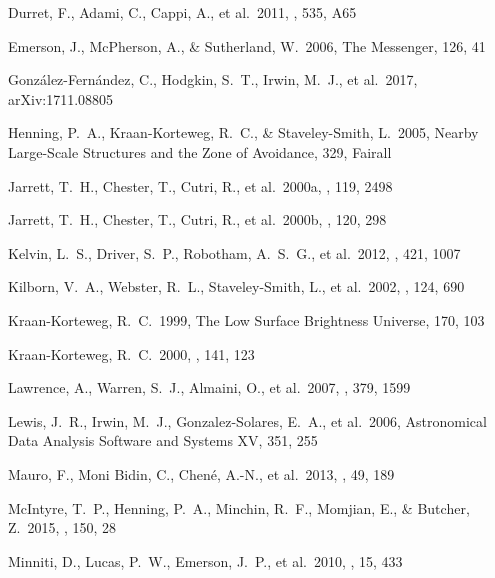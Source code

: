 \documentclass[preprint2]{aastex}
\begin{document}
\begin{thebibliography}{}
    Durret, F., Adami, C., Cappi, A., et al.\ 2011, \aap, 535, A65 

    Emerson, J., McPherson, A., \& Sutherland, W.\ 2006, The Messenger, 126, 41

      Gonz{\'a}lez-Fern{\'a}ndez, C., Hodgkin, S.~T., Irwin, M.~J., et al.\ 2017, arXiv:1711.08805
         
      Henning, P.~A., Kraan-Korteweg, R.~C., \& Staveley-Smith, L.\ 2005, Nearby Large-Scale Structures and the Zone of Avoidance, 329, Fairall 

    Jarrett, T.~H., Chester, T., Cutri, R., et al.\ 2000a, \aj, 119, 2498 
          
    Jarrett, T.~H., Chester, T., Cutri, R., et al.\ 2000b, \aj, 120, 298 

 Kelvin, L.~S., Driver, S.~P., Robotham, A.~S.~G., et al.\ 2012, \mnras, 421, 1007 

 Kilborn, V.~A., Webster, R.~L., Staveley-Smith, L., et al.\ 2002, \aj, 124, 690 

    Kraan-Korteweg, R.~C.\ 1999, The Low Surface Brightness Universe, 170, 103 
           
    Kraan-Korteweg, R.~C.\ 2000, \aaps, 141, 123 

 Lawrence, A., Warren, S.~J., Almaini, O., et al.\ 2007, \mnras, 379, 1599 

    Lewis, J.~R., Irwin, M.~J., Gonzalez-Solares, E.~A., et al.\ 2006, Astronomical Data Analysis Software and Systems XV, 351, 255 
 
    Mauro, F., Moni Bidin, C., Chen{\'e}, A.-N., et al.\ 2013, \rmxaa, 49, 189 

    McIntyre, T.~P., Henning, P.~A., Minchin, R.~F., Momjian, E., \& Butcher, Z.\ 2015, \aj, 150, 28
     
    Minniti, D., Lucas, P.~W., Emerson, J.~P., et al.\ 2010, \na, 15, 433


\end{thebibliography}
\end{document}
